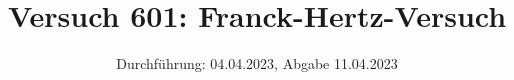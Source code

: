 

\title{Versuch 601: Franck-Hertz-Versuch}
\date{Durchführung: 04.04.2023, Abgabe 11.04.2023}


\maketitle
\thispagestyle{empty} 
\tableofcontents
\newpage
\setcounter{page}{1}






\printbibliography
\newpage
 
%

